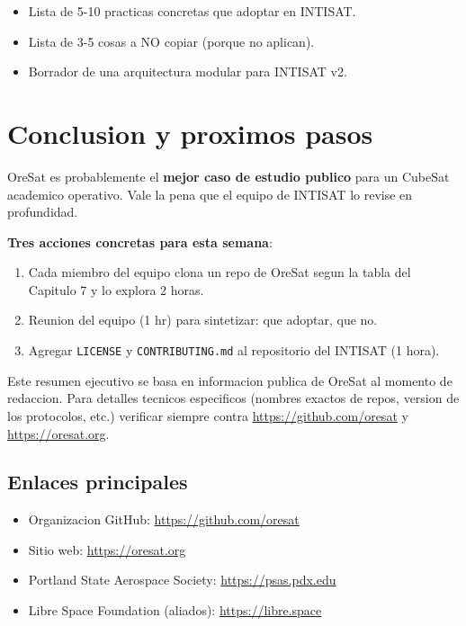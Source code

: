\documentclass[11pt,a4paper,oneside]{report}
\begin{document}
\begin{itemize}[leftmargin=2em]
  \item Lista de 5-10 practicas concretas que adoptar en INTISAT.
  \item Lista de 3-5 cosas a NO copiar (porque no aplican).
  \item Borrador de una arquitectura modular para INTISAT v2.
\end{itemize}

\chapter{Conclusion y proximos pasos}

OreSat es probablemente el \textbf{mejor caso de estudio publico}
para un CubeSat academico operativo. Vale la pena que el equipo de
INTISAT lo revise en profundidad.

\begin{recomendacion}
\textbf{Tres acciones concretas para esta semana}:

\begin{enumerate}[leftmargin=2em]
  \item Cada miembro del equipo clona un repo de OreSat segun la tabla
        del Capitulo 7 y lo explora 2 horas.
  \item Reunion del equipo (1 hr) para sintetizar: que adoptar, que no.
  \item Agregar \texttt{LICENSE} y \texttt{CONTRIBUTING.md} al
        repositorio del INTISAT (1 hora).
\end{enumerate}
\end{recomendacion}

\begin{caveat}
Este resumen ejecutivo se basa en informacion publica de OreSat al
momento de redaccion. Para detalles tecnicos especificos (nombres exactos
de repos, version de los protocolos, etc.) verificar siempre contra
\url{https://github.com/oresat} y \url{https://oresat.org}.
\end{caveat}

\section{Enlaces principales}

\begin{itemize}[leftmargin=2em]
  \item Organizacion GitHub: \url{https://github.com/oresat}
  \item Sitio web: \url{https://oresat.org}
  \item Portland State Aerospace Society: \url{https://psas.pdx.edu}
  \item Libre Space Foundation (aliados): \url{https://libre.space}
\end{itemize}
\end{document}
